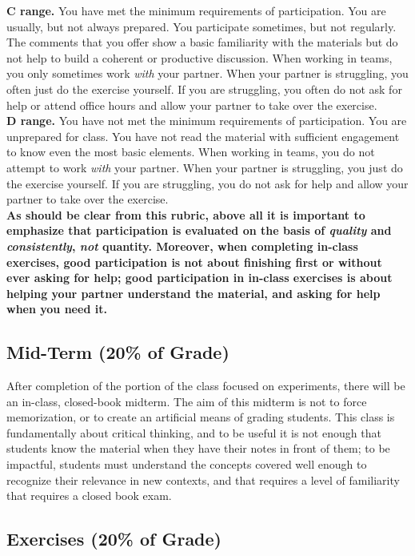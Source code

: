 \documentclass[12pt]{article}
\begin{document}
\textbf{C range.}  You have met the minimum requirements of participation.  You are usually, but not always prepared.  You participate sometimes, but not regularly.  The comments that you offer show a basic familiarity with the materials but do not help to build a coherent or productive discussion.  When working in teams, you only sometimes work \emph{with} your partner. When your partner is struggling, you often just do the exercise yourself. If you are struggling, you often do not ask for help or attend office hours and allow your partner to take over the exercise. \\

\textbf{D range.}  You have not met the minimum requirements of participation.  You are unprepared for class.  You have not read the material with sufficient engagement to know even the most basic elements.  When working in teams, you do not attempt to work \emph{with} your partner. When your partner is struggling, you just do the exercise yourself. If you are struggling, you do not ask for help and allow your partner to take over the exercise.\\

\textbf{As should be clear from this rubric, above all it is important to emphasize that participation is evaluated on the basis of \emph{quality} and \emph{consistently}, \emph{not} quantity. Moreover, when completing in-class exercises, good participation is not about finishing first or without ever asking for help; good participation in in-class exercises is about helping your partner understand the material, and asking for help when you need it.}

\subsection{Mid-Term (20\% of Grade)}

After completion of the portion of the class focused on experiments, there will be an in-class, closed-book midterm. The aim of this midterm is not to force memorization, or to create an artificial means of grading students. This class is fundamentally about critical thinking, and to be useful it is not enough that students know the material when they have their notes in front of them; to be impactful, students must understand the concepts covered well enough to recognize their relevance in new contexts, and that requires a level of familiarity that requires a closed book exam.

\subsection{Exercises (20\% of Grade)}
\end{document}
